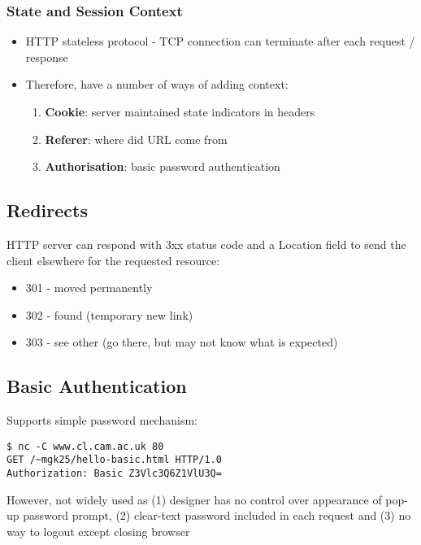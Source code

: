 \documentclass{article}
\newenvironment{cons}{\par\color{red}}{\par}
\begin{document}
\subsubsection{State and Session Context}
\begin{itemize}
	\item HTTP stateless protocol - TCP connection can terminate after each request / response
	
	\item Therefore, have a number of ways of adding context:
	
	\begin{enumerate}
		\item \textbf{Cookie}: server maintained state indicators in headers
		
		
		\item \textbf{Referer}: where did URL come from
		
		\item \textbf{Authorisation}: basic password authentication
		
	\end{enumerate}
\end{itemize}


\subsection{Redirects}
HTTP server can respond with 3xx status code and a Location field to send the client elsewhere for the requested resource:
\begin{itemize}
	\item 301 - moved permanently
	\item 302 - found (temporary new link)
	\item 303 - see other (go there, but may not know what is expected)
\end{itemize}

\subsection{Basic Authentication}
Supports simple password mechanism:
\begin{lstlisting}
$ nc -C www.cl.cam.ac.uk 80
GET /~mgk25/hello-basic.html HTTP/1.0
Authorization: Basic Z3Vlc3Q6Z1VlU3Q=
\end{lstlisting}

\begin{cons}
However, not widely used as (1) designer has no control over appearance of pop-up password prompt, (2) clear-text password included in each request and (3) no way to logout except closing browser
\end{cons}
\end{document}
